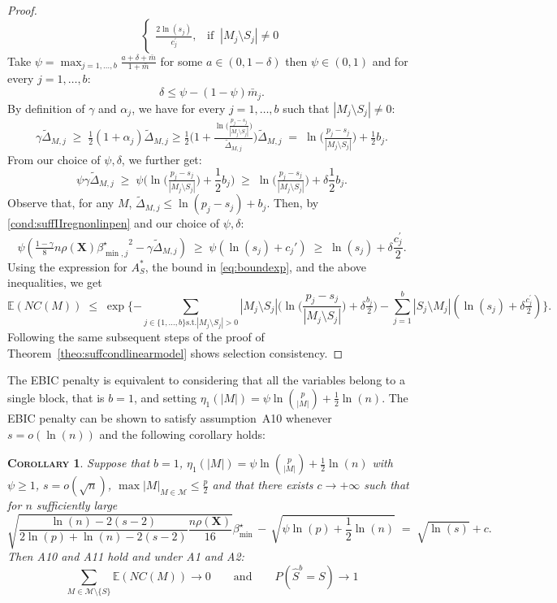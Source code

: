 \documentclass[aos]{imsart}
\theoremstyle{plain}
\newtheorem{cor}{\textsc{Corollary}}[section]
\newcommand{\E}{\mathbb{E}}
\newcommand{\bs}{\boldsymbol}
\begin{document}
\begin{supplement}
\begin{proof}
$$\begin{cases}
    \frac{2\ln(s_j)}{c^{\prime}_{j}},\;\;\; \text{if}\;\;|M_j \setminus S_j| \neq 0
\end{cases}$$
Take $\psi=\max_{j=1, \ldots,b}\frac{a + \delta + \bar{m}}{1+\bar{m}}$ for some $a \in(0, 1- \delta)$ then $\psi \in (0,1)$ and for every $j=1,\ldots,b$:
$$\delta \leq \psi-(1-\psi)\bar{m}_j.$$ 
By definition of $\gamma$ and $\alpha_j$, we have for every $j=1,\ldots,b$ such that $|M_j \setminus S_j|\neq0$:
$$
\gamma\tilde{\Delta}_{M, j}\;\geq\;\tfrac12 (1+\alpha_j)\tilde{\Delta}_{M, j}\geq \tfrac12 \bigg(1+\tfrac{\ln\big(\tfrac{p_j-s_j}{|M_j\setminus S_j|}\big)}{\tilde{\Delta}_{M, j}}\bigg)\tilde{\Delta}_{M, j} \;=\; \ln\big(\tfrac{p_j-s_j}{|M_j\setminus S_j|}\big)+ \tfrac12b_{j}.
$$
From our choice of $\psi,\delta$, we further get:
$$\psi\gamma\tilde{\Delta}_{M, j} \;\geq\; \psi\bigg(\ln\big(\tfrac{p_j-s_j}{|M_j\setminus S_j|}\big)+ \frac12b_{j}\bigg) \;\geq\; \ln\big(\tfrac{p_j-s_j}{|M_j\setminus S_j|}\big)+ \delta\frac12b_{j}.$$
Observe that, for any $M$, $\tilde{\Delta}_{M, j} \leq \ln(p_j-s_j)+b_j$. Then, by \eqref{cond:suffIIregnonlinpen} and our choice of $\psi,\delta$:
$$\psi\left(\tfrac{1-\gamma}{8} n \rho(\bs X) {\beta^{\star}_{\min,j}}^{2} - \gamma\tilde{\Delta}_{M, j}\right) \;\geq\; \psi\left(\ln(s_j)+c_j'\right) \;\geq\; \ln(s_j)+\delta \frac{c^{\prime}_j}{2}.
$$
Using the expression for $A_S^*$, the bound in \eqref{eq:boundexp}, and the above inequalities, we get
$$
\E(NC(M))\;\leq\;\exp\{- \sum_{j \in \{1,\ldots, b\} \text{s.t.} |M_j \setminus S_j| > 0} |M_j\setminus S_j|\bigg(\ln\bigg(\frac{p_j-s_j}{|M_j\setminus S_j|}\bigg)+\delta \tfrac{b_j}{2}\bigg)-\sum_{j=1}^b |S_j\setminus M_j|(\ln(s_j)+\delta \tfrac{c^{\prime}_j}{2})\}.
$$
Following the same subsequent steps of the proof of Theorem~\ref{theo:suffcondlinearmodel} shows selection consistency.
\end{proof}

The EBIC penalty is equivalent to considering that all the variables belong to a single block, that is $b=1$, and setting $\eta_1(|M|)=\psi\ln{p\choose |M|} + \tfrac{1}{2}\ln(n)$. The EBIC penalty can be shown to satisfy assumption~A10 whenever $s=o(\ln(n))$ and the following corollary holds:
\begin{cor}
    Suppose that $b=1$, $\eta_1(|M|)=\psi \ln {p\choose |M|} + \tfrac{1}{2}\ln(n)$ with $\psi\geq1$, $s=o(\sqrt{n})$, $\max|M|_{M\in\mathcal{M}} \leq \tfrac{p}{2}$ and that there exists $c\to +\infty$ such that for $n$ sufficiently large
    \begin{equation}\label{eq:betaminebic}
        \sqrt{\frac{\ln(n)-2(s-2)}{2 \ln(p)+\ln(n)-2(s-2)}\frac{n\rho(\bs X)}{16}}{{\beta_{\min}^{\star}}} \,- \,\sqrt{\psi\ln(p) + \frac{1}{2}\ln(n)} \;=\; \sqrt{\ln(s)} + c .
    \end{equation}
    Then A10 and A11 hold and under A1 and A2: $$\sum_{M \in \mathcal{M}\setminus \{S\}}\E\left(NC(M)\right)\to 0 \qquad \mbox{and} \qquad P(\widehat{S}^b = S) \to 1$$    
\end{cor}


\end{supplement}
\end{document}
